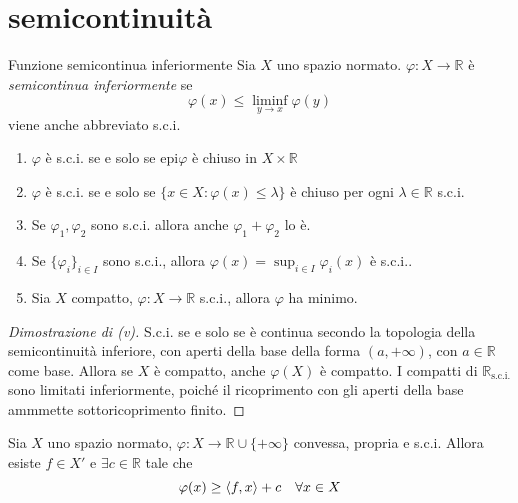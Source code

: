 \section{semicontinuità}
\begin{definition}{Funzione semicontinua inferiormente}
    Sia \(X\) uno spazio normato.
    \(\varphi : X \to \mathbb{R}\) è \emph{semicontinua inferiormente} se
    \[
      \varphi {(x)} \le \liminf_{y \to x} \varphi {(y)}
    \]
    viene anche abbreviato s.c.i.
\end{definition}
\begin{proposition}
\begin{enumerate}[label = (\roman*)]
    \item \(\varphi \) è s.c.i. se e solo se \(\mathrm{epi}\varphi \) è chiuso in \(X \times \mathbb{R}\) 
    \item \(\varphi \) è s.c.i. se e solo se \(\{x \in X : \varphi {(x)} \le \lambda\} \) è chiuso per ogni \(\lambda \in \mathbb{R}\) s.c.i.
    \item Se \(\varphi_{1}, \varphi_{2}\) sono s.c.i.
        allora anche \(\varphi_{1} + \varphi_{2}\) lo è.

    \item Se \(\{\varphi_i\}_{i \in I}\) sono s.c.i., allora \(\varphi{(x)} = \sup_{i \in I} \varphi_i{(x)}\) è s.c.i..
    \item Sia \(X\) compatto, \(\varphi : X \to \mathbb{R}\) s.c.i., allora \(
        \varphi \) ha minimo.
\end{enumerate}
\end{proposition}
\begin{proof}[Dimostrazione di (v)]
    S.c.i. se e solo se è continua secondo la topologia della semicontinuità
    inferiore, con aperti della base della forma \((a, +\infty)\), con \(a \in \mathbb{R}
    \)  come base. Allora se \(X\) è compatto, anche \(\varphi{(X)}\) è compatto. I compatti di \(\mathbb{R}_\text{s.c.i.}\) sono limitati inferiormente, poiché il ricoprimento con gli aperti della base ammmette sottoricoprimento finito.
\end{proof}
\begin{theorem}{}
    Sia \(X\) uno spazio normato, \(\varphi  : X \to \mathbb{R} \cup \{+\infty\} \) convessa, propria e s.c.i. Allora esiste \(f \in X'\) e \(\exists c \in \mathbb{R}\) tale che
    \[
      \varphi  {(x)} \ge {\left\langle f, x\right\rangle} + c \quad \forall x \in X
    \]
\end{theorem}





